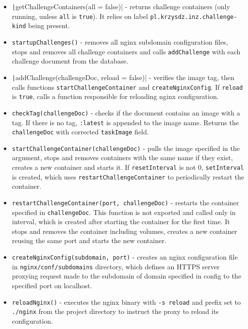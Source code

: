 \begin{itemize}
    \item \texttt|getChallengeContainers(all = false)| - returns challenge containers (only running, unless \texttt{all} is \texttt{true}). It relies on label \texttt{pl.krzysdz.inz.challenge-kind} being present.
    \item \texttt{startupChallenges()} - removes all nginx subdomain configuration files, stops and removes all challenge containers and calls \texttt{addChallenge} with each challenge document from the database.
    \item \texttt|addChallenge(challengeDoc, reload = false)| - verifies the image tag, then calls functions \texttt{startChallengeContainer} and \texttt{createNginxConfig}. If \texttt{reload} is \texttt{true}, calls a function responsible for reloading nginx configuration.
    \item \texttt{checkTag(challengeDoc)} - checks if the document contains an image with a tag. If there is no tag, \texttt{:latest} is appended to the image name. Returns the \texttt{challengeDoc} with corrected \texttt{taskImage} field.
    \item \texttt{startChallengeContainer(challengeDoc)} - pulls the image specified in the argument, stops and removes containers with the same name if they exist, creates a new container and starts it. If \texttt{resetInterval} is not 0, \texttt{setInterval} is created, which uses \texttt{restartChallengeContainer} to periodically restart the container.
    \item \texttt{restartChallengeContainer(port, challengeDoc)} - restarts the container specified in \texttt{challengeDoc}. This function is not exported and called only in interval, which is created after starting the container for the first time. It stops and removes the container including volumes, creates a new container reusing the same port and starts the new container.
    \item \texttt{createNginxConfig(subdomain, port)} - creates an nginx configuration file in \texttt{nginx/conf/subdomains} directory, which defines an HTTPS server proxying request made to the subdomain of domain specified in config to the specified port on localhost.
    \item \texttt{reloadNginx()} - executes the nginx binary with \texttt{-s reload} and prefix set to \texttt{./nginx} from the project directory to instruct the proxy to reload its configuration.
\end{itemize}

